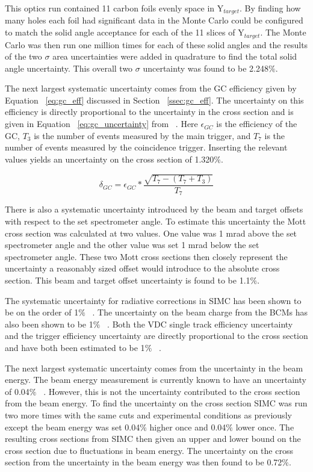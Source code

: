 This optics run contained 11 carbon foils evenly space in Y$_{target}$. By finding how many holes each foil had significant data in the Monte Carlo could be configured to match the solid angle acceptance for each of the 11 slices of Y$_{target}$. The Monte Carlo was then run one million times for each of these solid angles and the results of the two $\sigma$ area uncertainties were added in quadrature to find the total solid angle uncertainty. This overall two $\sigma$ uncertainty was found to be 2.248$\%$.

The next largest systematic uncertainty comes from the GC efficiency given by Equation ~\ref{eq:gc_eff} discussed in Section ~\ref{ssec:gc_eff}. The uncertainty on this efficiency is directly proportional to the uncertainty in the cross section and is given in Equation ~\ref{eq:gc_uncertainty} from ~\cite{dien_gc}. Here $\epsilon_{GC}$ is the efficiency of the GC, $T_3$ is the number of events measured by the main trigger, and $T_7$ is the number of events measured by the coincidence trigger. Inserting the relevant values yields an uncertainty on the cross section of 1.320$\%$.

\begin{equation} \label{eq:gc_uncertainty}
	\delta_{GC} = \epsilon_{GC} * \frac{\sqrt{T_7-(T_7+T_3)}}{T_7}
\end{equation}

There is also a systematic uncertainty introduced by the beam and target offsets with respect to the set spectrometer angle. To estimate this uncertainty the Mott cross section was calculated at two values. One value was 1 mrad above the set spectrometer angle and the other value was set 1 mrad below the set spectrometer angle. These two Mott cross sections then closely represent the uncertainty a reasonably sized offset would introduce to the absolute cross section. This beam and target offset uncertainty is found to be 1.1$\%$.

The systematic uncertainty for radiative corrections in SIMC has been shown to be on the order of 1$\%$ ~\cite{Thesis:Wang}. The uncertainty on the beam charge from the BCMs has also been shown to be 1$\%$ ~\cite{Thesis:Wang}. Both the VDC single track efficiency uncertainty and the trigger efficiency uncertainty are directly proportional to the cross section and have both been estimated to be 1$\%$ ~\cite{Thesis:Ye}.

The next largest systematic uncertainty comes from the uncertainty in the beam energy. The beam energy measurement is currently known to have an uncertainty of 0.04$\%$ ~\cite{doug}. However, this is not the uncertainty contributed to the cross section from the beam energy. To find the uncertainty on the cross section SIMC was run two more times with the same cuts and experimental conditions as previously except the beam energy was set 0.04$\%$ higher once and 0.04$\%$ lower once. The resulting cross sections from SIMC then given an upper and lower bound on the cross section due to fluctuations in beam energy. The uncertainty on the cross section from the uncertainty in the beam energy was then found to be 0.72$\%$.

